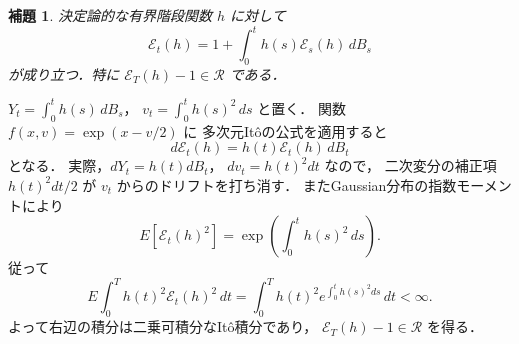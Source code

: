 \documentclass[a5paper,10pt,onecolumn]{jsarticle}
\makeatletter
\theoremstyle{mathnotetheorem}
\newtheorem{lemma}[theorem]{補題}
\renewcommand{\proofname}{証明}
\renewenvironment{proof}[1][\proofname]{%
  \par\pushQED{\qed}\normalfont\topsep4\p@\@plus2\p@\relax
  \trivlist\item[\hskip\labelsep\bfseries #1]\ignorespaces
}{\popQED\endtrivlist\@endpefalse}
\makeatother
\begin{document}
\begin{lemma}\label{lem:exponential}
決定論的な有界階段関数 $h$ に対して
\[
 \mathcal E_t(h)=1+\int_0^t h(s)\mathcal E_s(h)\,dB_s
\]
が成り立つ．特に
$\mathcal E_T(h)-1\in\mathcal R$ である．
\end{lemma}
\begin{proof}
$Y_t=\int_0^t h(s)\,dB_s$，
$v_t=\int_0^t h(s)^2\,ds$ と置く．
関数 $f(x,v)=\exp(x-v/2)$ に
多次元It\^oの公式を適用すると
\[
 d\mathcal E_t(h)=h(t)\mathcal E_t(h)\,dB_t
\]
となる．
実際，$dY_t=h(t)dB_t$，
$dv_t=h(t)^2dt$ なので，
二次変分の補正項 $h(t)^2dt/2$ が
$v_t$ からのドリフトを打ち消す．
またGaussian分布の指数モーメントにより
\[
 E[\mathcal E_t(h)^2]
 =\exp\!\left(\int_0^th(s)^2\,ds\right).
\]
従って
\[
 E\int_0^T h(t)^2\mathcal E_t(h)^2\,dt
 =\int_0^Th(t)^2
   e^{\int_0^t h(s)^2ds}\,dt<\infty.
\]
よって右辺の積分は二乗可積分なIt\^o積分であり，
$\mathcal E_T(h)-1\in\mathcal R$ を得る．
\end{proof}
\end{document}
